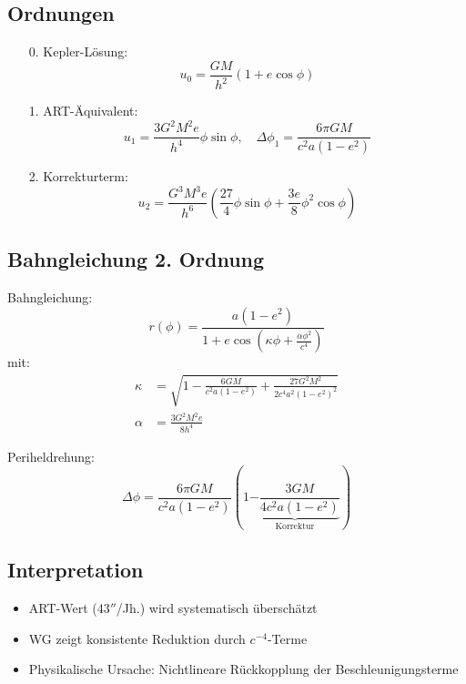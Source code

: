 \subsection{Ordnungen}
\begin{itemize}
\item[0.] Kepler-Lösung:
\begin{equation}
u_0 = \frac{GM}{h^2}(1 + e\cos\phi)
\end{equation}

\item[1.] ART-Äquivalent:
\begin{equation}
u_1 = \frac{3G^2M^2e}{h^4}\phi\sin\phi,\quad \Delta\phi_1 = \frac{6\pi GM}{c^2a(1-e^2)}
\end{equation}

\item[2.] Korrekturterm:
\begin{equation}
u_2 = \frac{G^3M^3e}{h^6}\left(\frac{27}{4}\phi\sin\phi + \frac{3e}{8}\phi^2\cos\phi\right)
\end{equation}
\end{itemize}

\subsection{Bahngleichung 2. Ordnung}
Bahngleichung:
\begin{equation}
\boxed
{
    r(\phi) = \frac{a(1-e^2)}{1 + e\cos\left(\kappa\phi + \frac{\alpha\phi^2}{c^4}\right)}
}
\end{equation}
mit:
\begin{align}
\kappa &= \sqrt{1 - \frac{6GM}{c^2a(1-e^2)} + \frac{27G^2M^2}{2c^4a^2(1-e^2)^2}}\\
\alpha &= \frac{3G^2M^2e}{8h^4}
\end{align}

Periheldrehung:
\begin{equation}
\Delta\phi = \frac{6\pi GM}{c^2a(1-e^2)}\left(1 \underbrace{- \frac{3GM}{4c^2a(1-e^2)}}_{\text{Korrektur}}\right)
\end{equation}

\subsection{Interpretation}
\begin{itemize}
\item ART-Wert ($43''$/Jh.) wird systematisch überschätzt
\item WG zeigt konsistente Reduktion durch $c^{-4}$-Terme
\item Physikalische Ursache: Nichtlineare Rückkopplung der Beschleunigungsterme
\end{itemize}
